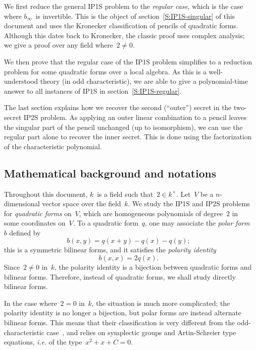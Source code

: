 \documentclass{lms}%
\begin{document}
We first reduce the general IP1S problem to the \emph{regular case},
which is the case where $b_{∞}$~is invertible. This is the object of
section~\ref{S:IP1S-singular} of this document and uses the Kronecker
classification of pencils of quadratic forms. Although this dates back to
Kronecker, the classic proof uses complex analysis; we give a proof over
any field where~$2 ≠ 0$.

We then prove that the regular case of the IP1S problem simplifies to a
reduction problem for some quadratic forms over a local algebra. As this
is a well-understood theory (in odd characteristic), we are able to give
a polynomial-time answer to all instances of IP1S in
section~\ref{S:IP1S-regular}.

The last section explains how we recover the second (``outer'') secret in
the two-secret IP2S problem. As applying an outer linear combination to a
pencil leaves the singular part of the pencil unchanged (up to
isomorphism), we can use the regular part alone to recover the inner
secret. This is done using the factorization of the characteristic
polynomial.

\subsection*{Mathematical background and notations}%
Throughout this document, $k$~is a field such that~$2 ∈ k^{×}$.
Let~$V$ be a $n$-dimensional vector space over the field~$k$. We study
the IP1S and IP2S problems for \emph{quadratic forms} on~$V$, which are
homogeneous polynomials of degree~$2$ in some coordinates on~$V$. To a
quadratic form~$q$, one may associate the \emph{polar form}~$b$ defined
by
\begin{equation*}\label{eq:polar}
b(x,y) = q(x+y) - q(x) - q(y);
\end{equation*}
this is a symmetric bilinear forms, and it satisfies the \emph{polarity
identity}
\begin{equation*}\label{eq:polarity}
b(x,x) = 2q(x).
\end{equation*}
Since~$2 ≠ 0$ in~$k$, the polarity identity is a bijection between
quadratic forms and bilinear forms. Therefore, instead of quadratic
forms, we shall study directly bilinear forms.

In the case where~$2 = 0$ in~$k$, the situation is much more complicated;
the polarity identity is no longer a bijection, but polar forms are
instead alternate bilinear forms. This means that their classification is
very different from the odd-characteristic case~\cite{milnorhusemoller},
and relies on symplectic groups and Artin-Schreier type equations,
\emph{i.e.} of the type~$x^2+x+C = 0$.
\end{document}
